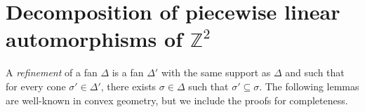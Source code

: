 \documentclass[11pt]{amsart}
\theoremstyle{definition}
\theoremstyle{plain}
\theoremstyle{remark}
\numberwithin{equation}{section}
\def\R{\mathbb{R}}
\def\Z{\mathbb{Z}}
\def\S{\mathbb{S}}
\def\N{\mathbb{N}}
\def\RR{{\mathcal{R}}}
\def\QQ{{\mathcal{Q}}}
\def\fan{\Delta}
\begin{document}
%
%
%
%
%
%


\section{Decomposition of piecewise linear automorphisms of $\Z^2$}
\label{Sec:decomposition}

A \emph{refinement} of a fan $\Delta$ is a fan $\Delta'$ with the same support as $\Delta$ and such that for every cone $\sigma'\in\fan'$, there exists $\sigma\in\fan$ such that $\sigma'\subseteq\sigma$. The following lemmas are well-known in convex geometry, but we include the proofs for completeness.
\end{document}
